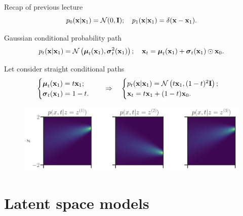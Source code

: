 \begin{frame}{Recap of previous lecture}
	\[
		p_0(\mathbf{x} | \mathbf{x}_1) = \mathcal{N}(0, \mathbf{I}); \quad p_1(\mathbf{x} | \mathbf{x}_1) = \delta(\mathbf{x} - \mathbf{x}_1).
	\]
	
	\begin{block}{Gaussian conditional probability path}
		\vspace{-0.5cm}
		\[
			p_t(\mathbf{x} | \mathbf{x}_1) = \mathcal{N}\left(\boldsymbol{\mu}_t(\mathbf{x}_1), \boldsymbol{\sigma}_t^2(\mathbf{x}_1)\right); \quad \mathbf{x}_t = \boldsymbol{\mu}_t(\mathbf{x}_1) +  \boldsymbol{\sigma}_t(\mathbf{x}_1) \odot \mathbf{x}_0.
		\]
		\vspace{-0.6cm}
	\end{block}
	Let consider straight conditional paths	
	\[
		\begin{cases}
			\boldsymbol{\mu}_t(\mathbf{x}_1) = t \mathbf{x}_1; \\
			\boldsymbol{\sigma}_t(\mathbf{x}_1) = 1 - t.
		\end{cases}
		\quad \Rightarrow \quad 
		\begin{cases}
			p_t(\mathbf{x} | \mathbf{x}_1) = \mathcal{N}\left(t \mathbf{x}_1, (1-t)^2 \mathbf{I}\right); \\
		 	\mathbf{x}_t = t \mathbf{x}_1 + (1 - t) \mathbf{x}_0. 
	 \end{cases}
	\]
	\vspace{-0.3cm}
	\begin{figure}
		\centering
		\includegraphics[width=\linewidth]{figs/conical_paths}
	\end{figure}
\end{frame}
\section{Latent space models}
